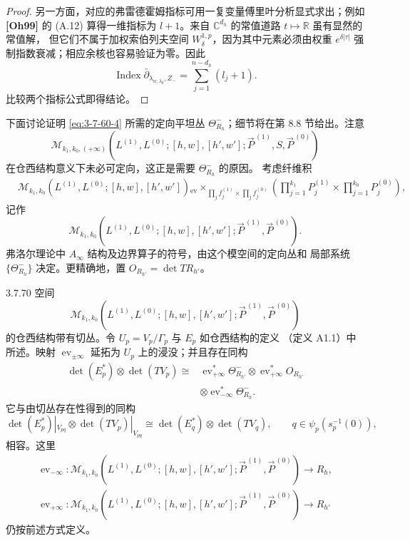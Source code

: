 \begin{proof}
另一方面，对应的弗雷德霍姆指标可用一复变量傅里叶分析显式求出；例如
\textbf{[Oh99]} 的 (A.12) 算得一维指标为 $l+1$。来自
$\mathbb C^{d_h}$ 的常值道路 $t\mapsto\mathbb R$ 虽有显然的常值解，
但它们不属于加权索伯列夫空间 $W_\delta^{1,p}$，因为其中元素必须由权重
$e^{\delta|\tau|}$ 强制指数衰减；相应余核也容易验证为零。因此
\[
 \operatorname{Index}
 \bar\partial_{\lambda_{w,\lambda_0},Z_-}
 =
 \sum_{j=1}^{n-d_h}(l_j+1).
\]
比较两个指标公式即得结论。
\end{proof}

下面讨论证明 \eqref{eq:3-7-60-4} 所需的定向平坦丛
$\Theta^-_{R_h}$；细节将在第 8.8 节给出。注意
\[
 \mathcal M_{k_1,k_0,(+\infty)}
 (L^{(1)},L^{(0)};[h,w],[h',w'];
 \vec P^{\,(1)},S,\vec P^{\,(0)})
\]
在仓西结构意义下未必可定向，这正是需要 $\Theta^-_{R_h}$ 的原因。
考虑纤维积
\[
\begin{aligned}
 &\mathcal M_{k_1,k_0}
 (L^{(1)},L^{(0)};[h,w],[h',w'])
 {}_{\operatorname{ev}}\mathop{\times}_{\prod_j f_j^{(1)}
 \times\prod_j f_j^{(0)}}
 \left(
 \prod_{j=1}^{k_1}P_j^{(1)}
 \times
 \prod_{j=1}^{k_0}P_j^{(0)}
 \right),
\end{aligned}
\]
记作
\[
 \mathcal M_{k_1,k_0}
 (L^{(1)},L^{(0)};[h,w],[h',w'];
 \vec P^{\,(1)},\vec P^{\,(0)}).
\]
弗洛尔理论中 $A_\infty$ 结构及边界算子的符号，由这个模空间的定向丛和
局部系统 $\{\Theta^-_{R_h}\}$ 决定。更精确地，置
$O_{R_{h'}}=\det TR_{h'}$。

\begin{lemma}{3.7.70}\label{lem:3-7-70}
空间
\[
 \mathcal M_{k_1,k_0}
 (L^{(1)},L^{(0)};[h,w],[h',w'];
 \vec P^{\,(1)},\vec P^{\,(0)})
\]
的仓西结构带有切丛。令 $U_p=V_p/\Gamma_p$ 与 $E_p$ 如仓西结构的定义
（定义 A1.1）中所述。映射
$\operatorname{ev}_{\pm\infty}$ 延拓为 $U_p$ 上的浸没；并且存在同构
\[
\begin{aligned}
 \det(E_p^*)\otimes\det(TV_p)
 \cong{}&
 \operatorname{ev}_{+\infty}^*\Theta^-_{R_{h'}}
 \otimes\operatorname{ev}_{+\infty}^*O_{R_{h'}}\\
 &\otimes\operatorname{ev}_{-\infty}^*\Theta^-_{R_h}.
\end{aligned}
\]
它与由切丛存在性得到的同构
\[
 \det(E_p^*)|_{V_{pq}}\otimes\det(TV_p)|_{V_{pq}}
 \cong
 \det(E_q^*)\otimes\det(TV_q),
 \qquad q\in\psi_p(s_p^{-1}(0)),
\]
相容。这里
\[
\begin{gathered}
 \operatorname{ev}_{-\infty}\colon
 \mathcal M_{k_1,k_0}
 (L^{(1)},L^{(0)};[h,w],[h',w'];
 \vec P^{\,(1)},\vec P^{\,(0)})\to R_h,\\
 \operatorname{ev}_{+\infty}\colon
 \mathcal M_{k_1,k_0}
 (L^{(1)},L^{(0)};[h,w],[h',w'];
 \vec P^{\,(1)},\vec P^{\,(0)})\to R_{h'}
\end{gathered}
\]
仍按前述方式定义。
\end{lemma}


